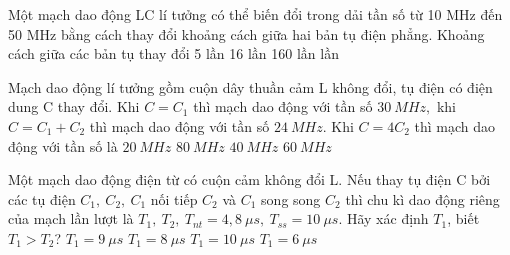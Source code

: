 \begin{vidu}%
Một mạch dao động LC lí tưởng có thể biến đổi trong dải tần số từ 10 MHz đến 50 MHz bằng cách thay đổi khoảng cách giữa hai bản tụ điện phẳng. Khoảng cách giữa các bản tụ thay đổi
\choice
{5 lần}
{16 lần}
{160 lần}
{ lần}
\end{vidu}
\begin{vidu}%
Mạch dao động lí tưởng gồm cuộn dây thuần cảm L không đổi, tụ điện có điện dung C thay đổi. Khi $C=C_1$ thì mạch dao động với tần số $30\ MHz,$ khi $C=C_1+C_2$ thì mạch dao động với tần số $24\ MHz$. Khi $C=4C_2$ thì mạch dao động với tần số là
\choice
{\True $20\ MHz$}
{$80\ MHz$}
{$40\ MHz$}
{$60\ MHz$}
\end{vidu}
\begin{vidu}%
Một mạch dao động điện từ có cuộn cảm không đổi L. Nếu thay tụ điện C bởi các tụ điện $C_1,\ C_2,\ C_1$ nối tiếp $C_2$ và $C_1$ song song $C_2$ thì chu kì dao động riêng của mạch lần lượt là $T_1,\ T_2,\ T_{nt} = 4,8\ \mu s,\ T_{ss} = 10\ \mu s$. Hãy xác định $T_1$, biết $T_1 > T_2$?
\choice
{$T_1 = 9\ \mu s$}
{\True $T_1 = 8\ \mu s$}
{$T_1 = 10\ \mu s$}
{$T_1 = 6\ \mu s$}
\end{vidu}
